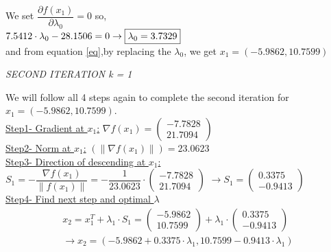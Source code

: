 We set $\dfrac{\partial f(x_1)}{\partial \lambda_0} = 0$ so,\\

$7.5412 \cdot \lambda_0-28.1506 = 0 \rightarrow \fbox{{\(\lambda_0 = 3.7329\)}}$ \\

and from equation \ref{eq},by replacing the $\lambda_0$, we get $x_1 = (-5.9862,10.7599)$
\\[2mm]
\begin{center}
	\textit{SECOND ITERATION k = 1}
\end{center} 
We will follow all 4 steps again to complete the second iteration for $x_1 = (-5.9862,10.7599)$.\\

\underline{Step1- Gradient at $x_1$:}
$\nabla f(x_1) = \left(\begin{array}{c}
	-7.7828\\
	21.7094
\end{array}\right)$\\

\underline{Step2- Norm at $x_1$:}
$(\|\nabla f(x_1)\|) = 23.0623$\\

\underline{Step3- Direction of descending at $x_1$:}
 $S_1 = -\dfrac{\nabla f(x_1)}{\|f(x_1)\|} = -\dfrac{1}{23.0623} \cdot \left(\begin{array}{c}
	-7.7828\\
	21.7094
\end{array}\right)$ $\rightarrow S_1 = \left(\begin{array}{c}
	0.3375 \\
	-0.9413
\end{array}\right)$\\

\underline{Step4- Find next step and optimal $\lambda$}\\[2mm]
\begin{equation}
	\begin{gathered}
	x_2 = x_1^T + \lambda_1 \cdot S_1 = \left(\begin{array}{c}
	    -5.9862 \\
		10.7599
	\end{array}\right) + \lambda_1 \cdot  \left(\begin{array}{c}
		0.3375 \\
		-0.9413
	\end{array}\right) \\[1mm]
	\rightarrow x_2 = \left(-5.9862+0.3375 \cdot \lambda_1, 10.7599-0.9413 \cdot \lambda_1\right)		
\end{gathered}
\label{eq5}
\end{equation}
\\[0.5mm]

